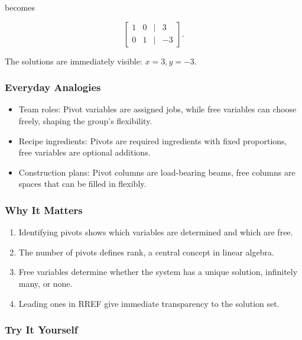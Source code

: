 \documentclass[
  letterpaper,
  DIV=11,
  numbers=noendperiod]{scrreprt}
\providecommand{\tightlist}{%
  \setlength{\itemsep}{0pt}\setlength{\parskip}{0pt}}
\begin{document}
becomes

\[
\begin{bmatrix}  
1 & 0 & | & 3 \\  
0 & 1 & | & -3  
\end{bmatrix}.
\]

The solutions are immediately visible: \(x=3, y=-3\).

\subsubsection{Everyday Analogies}\label{everyday-analogies-20}

\begin{itemize}
\tightlist
\item
  Team roles: Pivot variables are assigned jobs, while free variables
  can choose freely, shaping the group's flexibility.
\item
  Recipe ingredients: Pivots are required ingredients with fixed
  proportions, free variables are optional additions.
\item
  Construction plans: Pivot columns are load-bearing beams, free columns
  are spaces that can be filled in flexibly.
\end{itemize}

\subsubsection{Why It Matters}\label{why-it-matters-20}

\begin{enumerate}
\def\labelenumi{\arabic{enumi}.}
\tightlist
\item
  Identifying pivots shows which variables are determined and which are
  free.
\item
  The number of pivots defines rank, a central concept in linear
  algebra.
\item
  Free variables determine whether the system has a unique solution,
  infinitely many, or none.
\item
  Leading ones in RREF give immediate transparency to the solution set.
\end{enumerate}

\subsubsection{Try It Yourself}\label{try-it-yourself-23}
\end{document}
